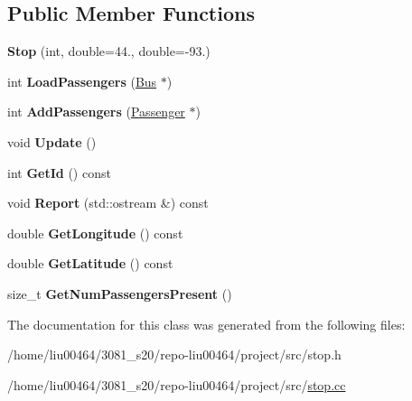\subsection*{Public Member Functions}
\begin{DoxyCompactItemize}
\item 
\mbox{\label{classStop_a59d881f072b1cf89512bb15a51ffc773}} 
{\bfseries Stop} (int, double=44., double=-\/93.)
\item 
\mbox{\label{classStop_a02c6dcba2b6de5fdd008cf623f19bf7c}} 
int {\bfseries Load\+Passengers} (\hyperlink{classBus}{Bus} $\ast$)
\item 
\mbox{\label{classStop_a20a8b6035679d92a7a838a03a102bcd1}} 
int {\bfseries Add\+Passengers} (\hyperlink{classPassenger}{Passenger} $\ast$)
\item 
\mbox{\label{classStop_aa373ae256ce6bc01ef13e876dfdec5bd}} 
void {\bfseries Update} ()
\item 
\mbox{\label{classStop_a2f3b845d5a338f197226c90696314904}} 
int {\bfseries Get\+Id} () const
\item 
\mbox{\label{classStop_a8e286b7cca2dce6977ebda6f01805d94}} 
void {\bfseries Report} (std\+::ostream \&) const
\item 
\mbox{\label{classStop_a89e650eecf57c03ba0a5222bf5f666f5}} 
double {\bfseries Get\+Longitude} () const
\item 
\mbox{\label{classStop_a20ad94a1876baf31d8cf0708aae4d21f}} 
double {\bfseries Get\+Latitude} () const
\item 
\mbox{\label{classStop_a38b567326cfc072113b305a77a9e1315}} 
size\+\_\+t {\bfseries Get\+Num\+Passengers\+Present} ()
\end{DoxyCompactItemize}


The documentation for this class was generated from the following files\+:\begin{DoxyCompactItemize}
\item 
/home/liu00464/3081\+\_\+s20/repo-\/liu00464/project/src/stop.\+h\item 
/home/liu00464/3081\+\_\+s20/repo-\/liu00464/project/src/\hyperlink{stop_8cc}{stop.\+cc}\end{DoxyCompactItemize}
